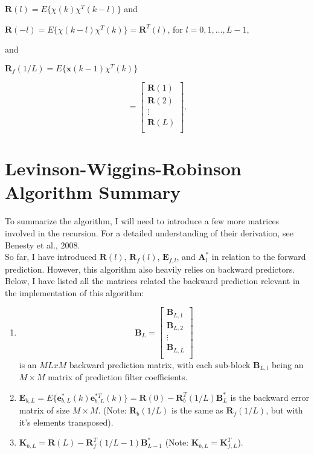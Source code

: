 \documentclass{article}
\begin{document}
\begin{center}
  $\textbf{R}(l) = E\big\{\chi(k)\chi^{T}(k-l)\big\}$ \quad and
\end{center}
\begin{center}
  $\textbf{R}(-l) = E\big\{\chi(k-l)\chi^{T}(k)\big\} = \textbf{R}^{T}(l)$, \quad for $l = 0, 1, \dots, L-1$,
\end{center}
and\\
\begin{center}
  $\textbf{R}_{f}(1/L) = E\big\{\textbf{x}(k-1)\chi^{T}(k)\big\}$
\end{center}
\[
   = \begin{bmatrix}
    \textbf{R}(1)\\
    \textbf{R}(2)\\
    \vdots\\
    \textbf{R}(L)\\
  \end{bmatrix}.
\]

\section{Levinson-Wiggins-Robinson Algorithm Summary}
To summarize the algorithm, I will need to introduce a few more matrices involved in the recursion.  For a detailed understanding of their derivation, see Benesty et al., 2008.\\

So far, I have introduced $\textbf{R}(l)$, $\textbf{R}_{f}(l)$, $\textbf{E}_{f,l}$, and $\textbf{A}^{*}_{l}$ in relation to the forward prediction.  However, this algorithm also heavily relies on backward predictors. Below, I have listed all the matrices related the backward prediction relevant in the implementation of this algorithm:\\
\begin{enumerate}
  \item
  \[
    \textbf{B}_{L} = \begin{bmatrix}
      \textbf{B}_{L,1} \\
      \textbf{B}_{L,2} \\
      \vdots \\
      \textbf{B}_{L,L} \\
    \end{bmatrix}
  \]
  is an $ML x M$ backward prediction matrix, with each sub-block $\textbf{B}_{L,l}$ being an $M \times M$ matrix of prediction filter coefficients.
  \item  
    $\textbf{E}_{b,L} = E\big\{\textbf{e}^{*}_{b,L}(k)\textbf{e}^{*T}_{b,L}(k)\big\} = \textbf{R}(0) - \textbf{R}^{T}_{b}(1/L)\textbf{B}^{*}_{L}$ \quad is the backward error matrix of size $M \times M$. (Note: $\textbf{R}_{b}(1/L)$ is the same as $\textbf{R}_{f}(1/L)$, but with it's elements transposed).
  \item
    $\textbf{K}_{b,L} = \textbf{R}(L) - \textbf{R}^{T}_{f}(1/L-1)\textbf{B}^{*}_{L-1}$ (Note: $\textbf{K}_{b,L}=\textbf{K}^{T}_{f,L}$).  
\end{enumerate}
\end{document}
